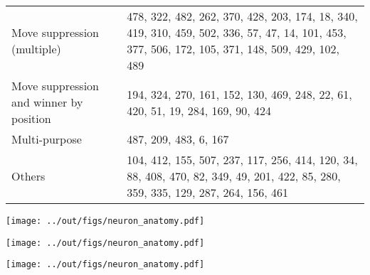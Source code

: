 \documentclass{article}
\newcommand{\ttgpt}{TicTacGPT\xspace}
\begin{document}
\begin{table}[h]
\begin{tabular}{p{}p{}}
        Move suppression (multiple)
         & 478, 322, 482, 262, 370, 428, 203, 174, 18, 340, 419, 310, 459, 502, 336, 57, 47, 14, 101, 453, 377, 506, 172, 105, 371, 148, 509, 429, 102, 489         \\
        Move suppression and winner by position
         & 194, 324, 270, 161, 152, 130, 469, 248, 22, 61, 420, 51, 19, 284, 169, 90, 424                                                                           \\
        Multi-purpose
         & 487, 209, 483, 6, 167                                                                                                                                    \\
        Others
         & 104, 412, 155, 507, 237, 117, 256, 414, 120, 34, 88, 408, 470, 82, 349, 49, 201, 422, 85, 280, 359, 335, 129, 287, 264, 156, 461                         \\
        \bottomrule
    \end{tabular}
\end{table}

\begin{center}
    \begin{figure*}[h]
        \centering
        \texttt{[image: ../out/figs/neuron\_anatomy.pdf]}
        \caption{Top neurons of \ttgpt visualised, ordered from the most to the least important.}
    \end{figure*}
    \begin{figure*}[h]
        \centering
        \texttt{[image: ../out/figs/neuron\_anatomy.pdf]}
        \caption*{Top neurons of \ttgpt visualised, ordered from the most to the least important. (cont.)}
    \end{figure*}
    \begin{figure*}[h]
        \centering
        \texttt{[image: ../out/figs/neuron\_anatomy.pdf]}
        \caption*{Top neurons of \ttgpt visualised, ordered from the most to the least important. (cont.)}
    \end{figure*}
\end{center}
\end{document}
